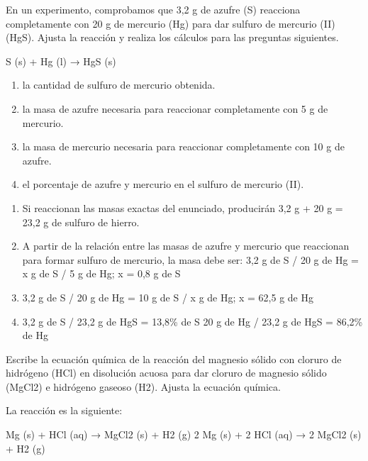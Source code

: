 \begin{exercise}
    En un experimento, comprobamos que 3,2 g de azufre
    (S) reacciona completamente con 20 g de mercurio (Hg) para dar
    sulfuro de mercurio (II) (HgS). Ajusta la reacción
    y realiza los cálculos para las preguntas siguientes.
    \begin{reaction*}
        S (s) + Hg (l) → HgS (s)
    \end{reaction*}
    \begin{enumerate}[label=\letraminuscula]
            \item la cantidad de sulfuro de mercurio obtenida.
            \item la masa de azufre necesaria para reaccionar completamente con
            5 g de mercurio.
            \item la masa de mercurio necesaria para reaccionar completamente con
            10 g de azufre.
            \item el porcentaje de azufre y mercurio en el
            sulfuro de mercurio (II).
    \end{enumerate}
    \begin{solu}{}

        \begin{enumerate}[label=\letraminuscula]
                \item Si reaccionan las masas exactas del enunciado,
                producirán 3,2 g + 20 g = 23,2 g de sulfuro
                de hierro.
                \item A partir de la relación entre las masas
                de azufre y mercurio que reaccionan para formar
                sulfuro de mercurio, la masa debe ser:
                3,2 g de S / 20 g de Hg = x g de S / 5 g de Hg;
                x = 0,8 g de S
                \item 3,2 g de S / 20 g de Hg = 10 g de S / x g de Hg;
                x = 62,5 g de Hg
                \item 3,2 g de S / 23,2 g de HgS = 13,8\% de S
                20 g de Hg / 23,2 g de HgS = 86,2\% de Hg
        \end{enumerate}
    \end{solu}
\end{exercise}

\begin{exercise}
    Escribe la ecuación química de la reacción del
    magnesio sólido con cloruro de hidrógeno (HCl)
    en disolución acuosa para dar cloruro de magnesio
    sólido (MgCl2) e hidrógeno gaseoso (H2). Ajusta
    la ecuación química.
    \begin{solu}

        La reacción es la siguiente:

        Mg (s) + HCl (aq) → MgCl2 (s) + H2 (g)
        2 Mg (s) + 2 HCl (aq) → 2 MgCl2 (s) + H2 (g)
    \end{solu}
\end{exercise}

